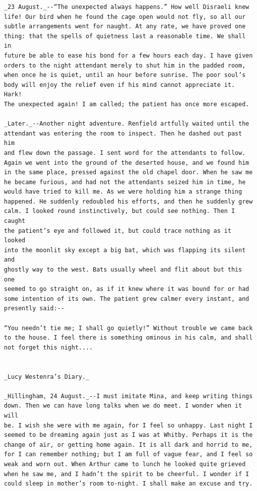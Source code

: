 \documentclass{article}
\begin{document}
\begin{verbatim}
_23 August._--“The unexpected always happens.” How well Disraeli knew
life! Our bird when he found the cage open would not fly, so all our
subtle arrangements went for naught. At any rate, we have proved one
thing: that the spells of quietness last a reasonable time. We shall in
future be able to ease his bond for a few hours each day. I have given
orders to the night attendant merely to shut him in the padded room,
when once he is quiet, until an hour before sunrise. The poor soul’s
body will enjoy the relief even if his mind cannot appreciate it. Hark!
The unexpected again! I am called; the patient has once more escaped.

_Later._--Another night adventure. Renfield artfully waited until the
attendant was entering the room to inspect. Then he dashed out past him
and flew down the passage. I sent word for the attendants to follow.
Again we went into the ground of the deserted house, and we found him
in the same place, pressed against the old chapel door. When he saw me
he became furious, and had not the attendants seized him in time, he
would have tried to kill me. As we were holding him a strange thing
happened. He suddenly redoubled his efforts, and then he suddenly grew
calm. I looked round instinctively, but could see nothing. Then I caught
the patient’s eye and followed it, but could trace nothing as it looked
into the moonlit sky except a big bat, which was flapping its silent and
ghostly way to the west. Bats usually wheel and flit about but this one
seemed to go straight on, as if it knew where it was bound for or had
some intention of its own. The patient grew calmer every instant, and
presently said:--

“You needn’t tie me; I shall go quietly!” Without trouble we came back
to the house. I feel there is something ominous in his calm, and shall
not forget this night....


_Lucy Westenra’s Diary._

_Hillingham, 24 August._--I must imitate Mina, and keep writing things
down. Then we can have long talks when we do meet. I wonder when it will
be. I wish she were with me again, for I feel so unhappy. Last night I
seemed to be dreaming again just as I was at Whitby. Perhaps it is the
change of air, or getting home again. It is all dark and horrid to me,
for I can remember nothing; but I am full of vague fear, and I feel so
weak and worn out. When Arthur came to lunch he looked quite grieved
when he saw me, and I hadn’t the spirit to be cheerful. I wonder if I
could sleep in mother’s room to-night. I shall make an excuse and try.


\end{verbatim}
\end{document}
